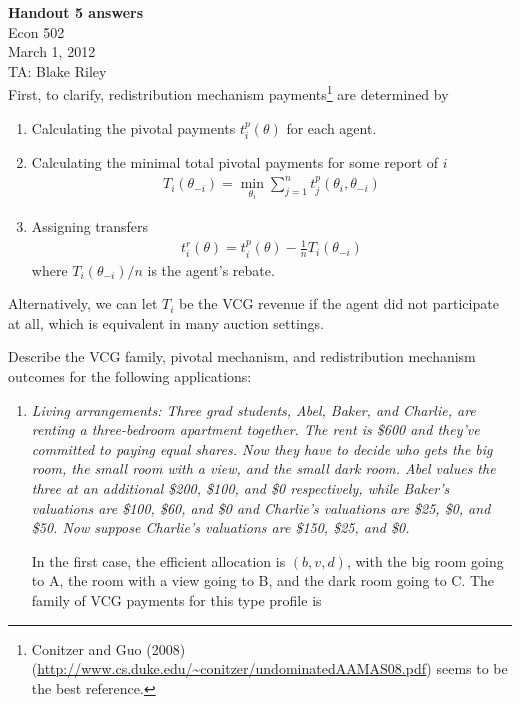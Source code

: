 \documentclass[letter, 10pt]{article}
\theoremstyle{basic}
\newcommand{\noti}{{{\scriptscriptstyle-}\!i}}
\begin{document}
\begin{spacing}{1.0}

\noindent
\textbf{Handout 5 answers} \\
Econ 502 \\
March 1, 2012 \\
TA: Blake Riley \\

\noindent
First, to clarify, redistribution mechanism payments\footnote{Conitzer and
  Guo (2008)
  (\url{http://www.cs.duke.edu/~conitzer/undominatedAAMAS08.pdf}) seems to
  be the best reference.} are determined by
  \begin{enumerate}
  \item Calculating the pivotal payments $t_i^p(\theta)$ for each agent.
  \item Calculating the minimal total pivotal payments for some report of
    $i$
    \begin{align*}
      T_i(\theta_\noti) = \min_{\theta_i} \sum_{j=1}^n t_j^p(\theta_i, \theta_\noti)
    \end{align*}
  \item Assigning transfers
    \begin{align*}
      t_i^r(\theta) = t_i^p(\theta) - \frac{1}{n} T_i(\theta_\noti)
    \end{align*}
    where $T_i(\theta_\noti)/n$ is the agent's rebate.
  \end{enumerate}
  Alternatively, we can let $T_i$ be the VCG revenue if the agent did not
  participate at all, which is equivalent in many auction settings.

\vspace{1em}
\noindent
  Describe the VCG family, pivotal mechanism, and redistribution mechanism
outcomes for the following applications:
  \begin{enumerate}
  \item \textit{Living arrangements: Three grad students, Abel, Baker, and
      Charlie, are renting a three-bedroom apartment together. The rent is
      \$600 and they've committed to paying equal shares. Now they have to
      decide who gets the big room, the small room with a view, and the
      small dark room. Abel values the three at an additional \$200,
      \$100, and \$0 respectively, while Baker's valuations are \$100,
      \$60, and \$0 and Charlie's valuations are \$25, \$0, and \$50. Now
      suppose Charlie's valuations are \$150, \$25, and \$0.}

  In the first case, the efficient allocation is $(b, v, d)$, with the big
  room going to A, the room with a view going to B, and the dark room
  going to C. The family of VCG payments for this type profile is


\end{enumerate}
\end{spacing}
\end{document}

